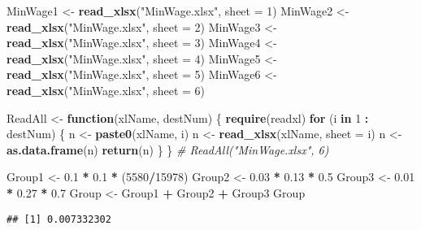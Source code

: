 \documentclass[]{article}
\newenvironment{Shaded}{\begin{snugshade}}{\end{snugshade}}
\newcommand{\CommentTok}[1]{\textcolor[rgb]{0.56,0.35,0.01}{\textit{#1}}}
\newcommand{\ControlFlowTok}[1]{\textcolor[rgb]{0.13,0.29,0.53}{\textbf{#1}}}
\newcommand{\DataTypeTok}[1]{\textcolor[rgb]{0.13,0.29,0.53}{#1}}
\newcommand{\DecValTok}[1]{\textcolor[rgb]{0.00,0.00,0.81}{#1}}
\newcommand{\FloatTok}[1]{\textcolor[rgb]{0.00,0.00,0.81}{#1}}
\newcommand{\KeywordTok}[1]{\textcolor[rgb]{0.13,0.29,0.53}{\textbf{#1}}}
\newcommand{\NormalTok}[1]{#1}
\newcommand{\OperatorTok}[1]{\textcolor[rgb]{0.81,0.36,0.00}{\textbf{#1}}}
\newcommand{\StringTok}[1]{\textcolor[rgb]{0.31,0.60,0.02}{#1}}
\begin{document}
\begin{Shaded}
\begin{Highlighting}[]
\NormalTok{MinWage1 <-}\StringTok{ }\KeywordTok{read_xlsx}\NormalTok{(}\StringTok{"MinWage.xlsx"}\NormalTok{, }\DataTypeTok{sheet =} \DecValTok{1}\NormalTok{)}
\NormalTok{MinWage2 <-}\StringTok{ }\KeywordTok{read_xlsx}\NormalTok{(}\StringTok{"MinWage.xlsx"}\NormalTok{, }\DataTypeTok{sheet =} \DecValTok{2}\NormalTok{)}
\NormalTok{MinWage3 <-}\StringTok{ }\KeywordTok{read_xlsx}\NormalTok{(}\StringTok{"MinWage.xlsx"}\NormalTok{, }\DataTypeTok{sheet =} \DecValTok{3}\NormalTok{)}
\NormalTok{MinWage4 <-}\StringTok{ }\KeywordTok{read_xlsx}\NormalTok{(}\StringTok{"MinWage.xlsx"}\NormalTok{, }\DataTypeTok{sheet =} \DecValTok{4}\NormalTok{)}
\NormalTok{MinWage5 <-}\StringTok{ }\KeywordTok{read_xlsx}\NormalTok{(}\StringTok{"MinWage.xlsx"}\NormalTok{, }\DataTypeTok{sheet =} \DecValTok{5}\NormalTok{)}
\NormalTok{MinWage6 <-}\StringTok{ }\KeywordTok{read_xlsx}\NormalTok{(}\StringTok{"MinWage.xlsx"}\NormalTok{, }\DataTypeTok{sheet =} \DecValTok{6}\NormalTok{)}

\NormalTok{ReadAll <-}\StringTok{ }\ControlFlowTok{function}\NormalTok{(xlName, destNum) \{}
  \KeywordTok{require}\NormalTok{(readxl)}
  \ControlFlowTok{for}\NormalTok{ (i }\ControlFlowTok{in} \DecValTok{1} \OperatorTok{:}\StringTok{ }\NormalTok{destNum) \{}
\NormalTok{    n <-}\StringTok{ }\KeywordTok{paste0}\NormalTok{(xlName, i)}
\NormalTok{    n <-}\StringTok{ }\KeywordTok{read_xlsx}\NormalTok{(xlName, }\DataTypeTok{sheet =}\NormalTok{ i)}
\NormalTok{    n <-}\StringTok{ }\KeywordTok{as.data.frame}\NormalTok{(n)}
    \KeywordTok{return}\NormalTok{(n)}
\NormalTok{  \}}
\NormalTok{\}}
\CommentTok{# ReadAll("MinWage.xlsx", 6)}

\NormalTok{Group1 <-}\StringTok{ }\FloatTok{0.1} \OperatorTok{*}\StringTok{ }\FloatTok{0.1} \OperatorTok{*}\StringTok{ }\NormalTok{(}\DecValTok{5580}\OperatorTok{/}\DecValTok{15978}\NormalTok{)}
\NormalTok{Group2 <-}\StringTok{ }\FloatTok{0.03} \OperatorTok{*}\StringTok{ }\FloatTok{0.13} \OperatorTok{*}\StringTok{ }\FloatTok{0.5}
\NormalTok{Group3 <-}\StringTok{ }\FloatTok{0.01} \OperatorTok{*}\StringTok{ }\FloatTok{0.27} \OperatorTok{*}\StringTok{ }\FloatTok{0.7}
\NormalTok{Group <-}\StringTok{ }\NormalTok{Group1 }\OperatorTok{+}\StringTok{ }\NormalTok{Group2 }\OperatorTok{+}\StringTok{ }\NormalTok{Group3}
\NormalTok{Group}
\end{Highlighting}
\end{Shaded}

\begin{verbatim}
## [1] 0.007332302
\end{verbatim}
\end{document}
